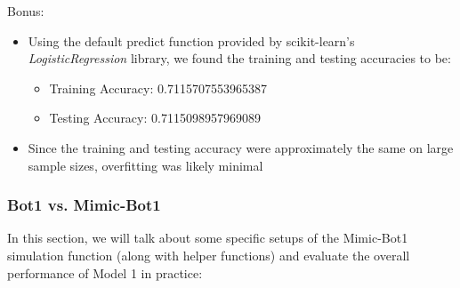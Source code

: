 \documentclass[11pt]{article}
\begin{document}
Bonus:

\begin{itemize}
    \item Using the default predict function provided by scikit-learn's \emph{LogisticRegression} library, we found the training and testing accuracies to be:
    \begin{itemize}
        \item Training Accuracy: 0.7115707553965387
        \item Testing Accuracy: 0.7115098957969089
    \end{itemize}
    \item Since the training and testing accuracy were approximately the same on large sample sizes, overfitting was likely minimal
\end{itemize}

\subsubsection{Bot1 vs. Mimic-Bot1}

In this section, we will talk about some specific setups of the Mimic-Bot1 simulation function (along with helper functions) and evaluate the overall performance of Model 1 in practice:
\end{document}
